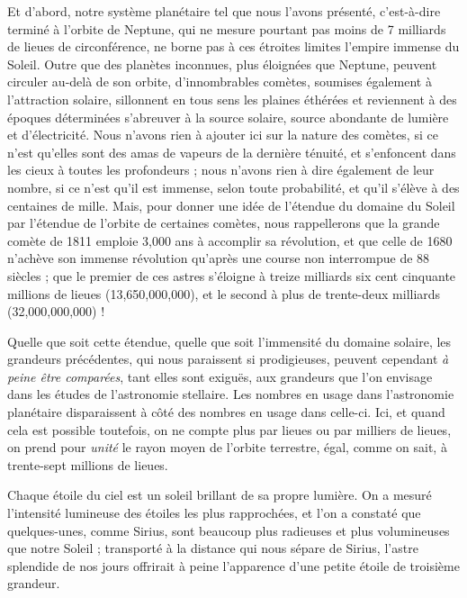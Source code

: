 \documentclass[a4paper, 11pt, oneside, landscape]{article}
\begin{document}
Et d'abord, notre système planétaire tel que nous l'avons présenté, c'est-à-dire terminé à l'orbite de Neptune, qui ne mesure pourtant pas moins de 7 milliards de lieues de circonférence, ne borne pas à ces étroites limites l'empire immense du Soleil. Outre que des planètes inconnues, plus éloignées que Neptune, peuvent circuler au-delà de son orbite, d'innombrables comètes, soumises également à l'attraction solaire, sillonnent en tous sens les plaines éthérées et reviennent à des époques déterminées s'abreuver à la source solaire, source abondante de lumière et d'électricité. Nous n'avons rien à ajouter ici sur la nature des comètes, si ce n'est qu'elles sont des amas de vapeurs de la dernière ténuité, et s'enfoncent dans les cieux à toutes les profondeurs ; nous n'avons rien à dire également de leur nombre, si ce n'est qu'il est immense, selon toute probabilité, et qu'il s'élève à des centaines de mille. Mais, pour donner une idée de l'étendue du domaine du Soleil par l'étendue de l'orbite de certaines comètes, nous rappellerons que la grande comète de 1811 emploie 3,000 ans à accomplir sa révolution, et que celle de 1680 n'achève son immense révolution qu'après une course non interrompue de 88 siècles ; que le premier de ces astres s'éloigne à treize milliards six cent cinquante millions de lieues (13,650,000,000), et le second à plus de trente-deux milliards (32,000,000,000) !

Quelle que soit cette étendue, quelle que soit l'immensité du domaine solaire, les grandeurs précédentes, qui nous paraissent si prodigieuses, peuvent cependant \emph{à peine être comparées}, tant elles sont exiguës, aux grandeurs que l'on envisage dans les études de l'astronomie stellaire. Les nombres en usage dans l'astronomie planétaire disparaissent à côté des nombres en usage dans celle-ci. Ici, et quand cela est possible toutefois, on ne compte plus par lieues ou par milliers de lieues, on prend pour \emph{unité} le rayon moyen de l'orbite terrestre, égal, comme on sait, à trente-sept millions de lieues.

Chaque étoile du ciel est un soleil brillant de sa propre lumière. On a mesuré l'intensité lumineuse des étoiles les plus rapprochées, et l'on a constaté que quelques-unes, comme Sirius, sont beaucoup plus radieuses et plus volumineuses que notre Soleil ; transporté à la distance qui nous sépare de Sirius, l'astre splendide de nos jours offrirait à peine l'apparence d'une petite étoile de troisième grandeur.
\end{document}
